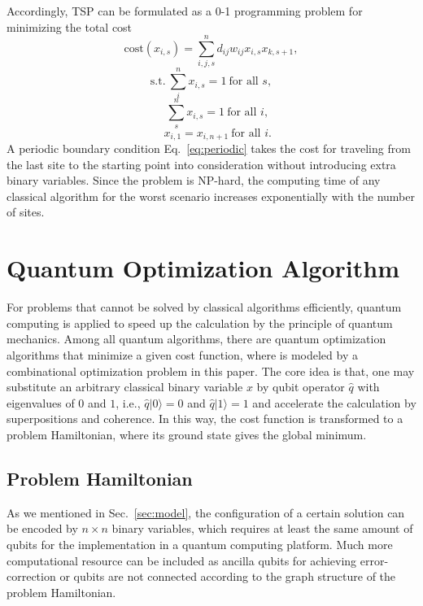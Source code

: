 \documentclass[aps,pra,twocolumn,superscriptaddress]{revtex4-2}
\begin{document}
Accordingly, TSP can be formulated as a 0-1 programming problem for minimizing the total cost
\begin{equation}
\label{eq:cost}
\text{cost}(x_{i,s})=\sum_{i,j,s}^n d_{ij}w_{ij}x_{i,s}x_{k,s+1},
\end{equation}
\begin{equation}
\label{eq:column}
\text{s.t.}\ \sum_i^n x_{i,s}=1\ \text{for all $s$},
\end{equation}
\begin{equation}
\label{eq:row}
\ \ \ \ \ \sum_s^n x_{i,s}=1\ \text{for all $i$},
\end{equation}
\begin{equation}
\label{eq:periodic}
\ \ \ \ \ x_{i,1}=x_{i,n+1}\ \text{for all $i$}.
\end{equation}
A periodic boundary condition Eq.~\eqref{eq:periodic} takes the cost for traveling from the last site to the starting point into consideration without introducing extra binary variables. Since the problem is NP-hard, the computing time of any classical algorithm for the worst scenario increases exponentially with the number of sites. 

\section{Quantum Optimization Algorithm}
For problems that cannot be solved by classical algorithms efficiently, quantum computing is applied to speed up the calculation by the principle of quantum mechanics. Among all quantum algorithms, there are quantum optimization algorithms that minimize a given cost function, where is modeled by a combinational optimization problem in this paper. The core idea is that, one may substitute an arbitrary  classical binary variable $x$ by qubit operator $\hat{q}$ with eigenvalues of $0$ and $1$, i.e., $\hat{q}|0\rangle=0$ and $\hat{q}|1\rangle=1$ and accelerate the calculation by superpositions and coherence. In this way, the cost function is transformed to a problem Hamiltonian, where its ground state gives the global minimum.
\subsection{Problem Hamiltonian}
As we mentioned in Sec.~\ref{sec:model}, the configuration of a certain solution can be encoded by $n\times n$ binary variables, which requires at least the same amount of qubits for the implementation in a quantum computing platform. Much more computational resource can be included as ancilla qubits for achieving error-correction or qubits are not connected according to the graph structure of the problem Hamiltonian.
\end{document}
